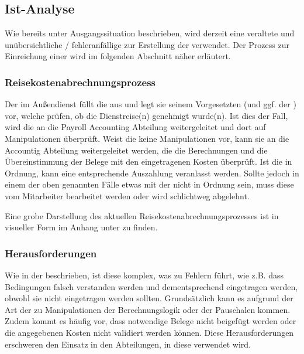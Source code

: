 \subsection{Ist-Analyse}

Wie bereits unter Ausgangssituation beschrieben, wird derzeit eine veraltete und unübersichtliche / fehleranfällige  zur Erstellung der  verwendet. Der Prozess zur Einreichung einer  wird im folgenden Abschnitt  näher erläutert.

\subsubsection{Reisekostenabrechnungsprozess}
\label{sec:Analysephase:Reisekostenabrechnungsprozess}

Der  im Außendienst füllt die  aus und legt sie seinem Vorgesetzten (und ggf. der ) vor, welche prüfen, ob die Dienstreise(n) genehmigt wurde(n). Ist dies der Fall, wird die an die Payroll Accounting Abteilung weitergeleitet und dort auf Manipulationen überprüft. Weist die  keine Manipulationen vor, kann sie an die Accountig Abteilung weitergeleitet werden, die die Berechnungen und die Übereinstimmung der Belege mit den eingetragenen Kosten überprüft. Ist die  in Ordnung, kann eine entsprechende Auszahlung veranlasst werden. Sollte jedoch in einem der oben genannten Fälle etwas mit der  nicht in Ordnung sein, muss diese vom Mitarbeiter bearbeitet werden oder wird schlichtweg abgelehnt.

Eine grobe Darstellung des aktuellen Reisekostenabrechnungsprozesses ist in visueller Form im Anhang unter  zu finden.

\subsubsection{Herausforderungen}

Wie in der  beschrieben, ist diese  komplex, was zu Fehlern führt, wie z.B. dass Bedingungen falsch verstanden werden und dementsprechend eingetragen werden, obwohl sie nicht eingetragen werden sollten. Grundsätzlich kann es aufgrund der Art der  zu Manipulationen der Berechnungslogik oder der Pauschalen kommen. Zudem kommt es häufig vor, dass notwendige Belege nicht beigefügt werden oder die angegebenen Kosten nicht validiert werden können. Diese Herausforderungen erschweren den Einsatz in den Abteilungen, in diese verwendet wird.

